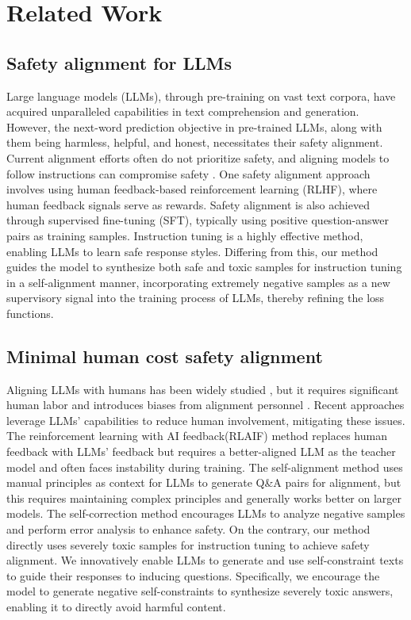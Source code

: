 \section{Related Work}
\label{2}
\subsection{Safety alignment for LLMs}
Large language models (LLMs)\cite{zhao2023survey}, through pre-training on vast text corpora, have acquired unparalleled capabilities \cite{bommasani2021opportunities} in text comprehension and generation.  However, the next-word prediction objective in pre-trained LLMs, along with them being harmless, helpful, and honest, necessitates their safety alignment. Current alignment efforts often do not prioritize safety, and aligning models to follow instructions can compromise safety \cite{bianchisafety, qi2024fine}. One safety alignment approach involves using human feedback-based reinforcement learning (RLHF)\cite{wu2024fine}, where human feedback signals serve as rewards. Safety alignment is also achieved through supervised fine-tuning (SFT), typically using positive question-answer pairs as training samples. Instruction tuning \cite{ouyang2022training} is a highly effective method, enabling LLMs to learn safe response styles. Differing from this, our method guides the model to synthesize both safe and toxic samples for instruction tuning in a self-alignment manner, incorporating extremely negative samples as a new supervisory signal into the training process of LLMs, thereby refining the loss functions.

\subsection{Minimal human cost safety alignment}
Aligning LLMs with humans has been widely studied \cite{stiennon2020learning, ouyang2022training}, but it requires significant human labor and introduces biases from alignment personnel \cite{wang2022self, kopf2024openassistant, wan2023poisoning}. Recent approaches leverage LLMs' capabilities to reduce human involvement, mitigating these issues. The reinforcement learning with AI feedback(RLAIF) \cite{akyürek2023rl4f} method replaces human feedback with LLMs' feedback but requires a better-aligned LLM as the teacher model and often faces instability during training. The self-alignment \cite{sun2024principle} method uses manual principles as context for LLMs to generate Q\&A pairs for alignment, but this requires maintaining complex principles and generally works better on larger models. The self-correction method \cite{chengaining} encourages LLMs to analyze negative samples and perform error analysis to enhance safety. On the contrary, our method directly uses severely toxic samples for instruction tuning to achieve safety alignment. We innovatively enable LLMs to generate and use self-constraint texts to guide their responses to inducing questions. Specifically, we encourage the model to generate negative self-constraints to synthesize severely toxic answers, enabling it to directly avoid harmful content.

